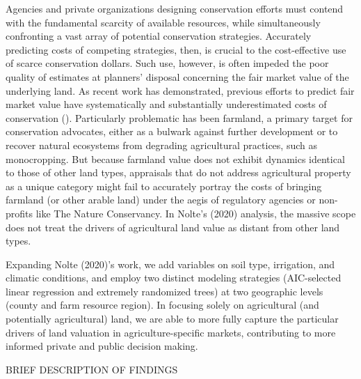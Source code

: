 \documentclass[12pt]{article}
\begin{document}
Agencies and private organizations designing conservation efforts must contend with the fundamental scarcity of available resources, while simultaneously confronting a vast array of potential conservation strategies. Accurately predicting costs of competing strategies, then, is crucial to the cost-effective use of scarce conservation dollars. Such use, however, is often impeded the poor quality of estimates at planners' disposal concerning the fair market value of the underlying land. As recent work has demonstrated, previous efforts to predict fair market value have systematically and substantially underestimated costs of conservation (\cite{Nolte2020High-resolutionStates}). Particularly problematic has been farmland, a primary target for conservation advocates, either as a bulwark against further development or to recover natural ecosystems from degrading agricultural practices, such as monocropping. But because farmland value does not exhibit dynamics identical to those of other land types, appraisals that do not address agricultural property as a unique category might fail to accurately portray the costs of bringing farmland (or other arable land) under the aegis of regulatory agencies or non-profits like The Nature Conservancy. In Nolte's (2020) analysis, the massive scope does not treat the drivers of agricultural land value as distant from other land types.

\par Expanding Nolte (2020)'s work, we add variables on soil type, irrigation, and climatic conditions, and employ two distinct modeling strategies (AIC-selected linear regression and extremely randomized trees) at two geographic levels (county and farm resource region). In focusing solely on agricultural (and potentially agricultural) land, we are able to more fully capture the particular drivers of land valuation in agriculture-specific markets, contributing to more informed private and public decision making.  

BRIEF DESCRIPTION OF FINDINGS
\end{document}
